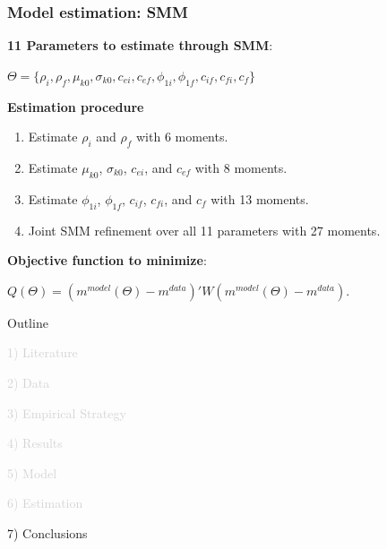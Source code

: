 \documentclass[aspectratio=169]{beamer}
\begin{document}
\begin{frame}
\frametitle{\textbf{Model estimation}: SMM} \label{model_estimation}

\textbf{11 Parameters to estimate through SMM}: 
\begin{center}
    $\Theta = \{\rho_i, \rho_f, \mu_{k0}, \sigma_{k0}, c_{ei}, c_{ef}, \phi_{1i}, \phi_{1f}, c_{if}, c_{fi}, c_{f}\}$
\end{center}

\vspace{5mm}

\textbf{Estimation procedure}

\begin{enumerate}
    \item Estimate $\rho_{i}$ and $\rho_{f}$ with 6 moments.
    \item Estimate $\mu_{k0}$, $\sigma_{k0}$, $c_{ei}$, and $c_{ef}$ with 8 moments.
    \item Estimate $\phi_{1i}$, $\phi_{1f}$, $c_{if}$, $c_{fi}$, and $c_f$ with 13 moments.
    \item Joint SMM refinement over all 11 parameters with 27 moments.
\end{enumerate}

\vspace{5mm}

\textbf{Objective function to minimize}:

\begin{center}
    $Q(\Theta) = (m^{model}(\Theta) - m^{data})' W (m^{model}(\Theta) - m^{data})$.
\end{center}

\end{frame}


\begin{frame}[noframenumbering]{Outline}

\Large

\textcolor{lightgray}{1) Literature}

\vspace{4mm}

\textcolor{lightgray}{2) Data}

\vspace{4mm}

\textcolor{lightgray}{3) Empirical Strategy}

\vspace{4mm}

\textcolor{lightgray}{4) Results}

\vspace{4mm}

\textcolor{lightgray}{5) Model}

\vspace{4mm}

\textcolor{lightgray}{6) Estimation}

\vspace{4mm}

7) Conclusions

\end{frame}
\end{document}
